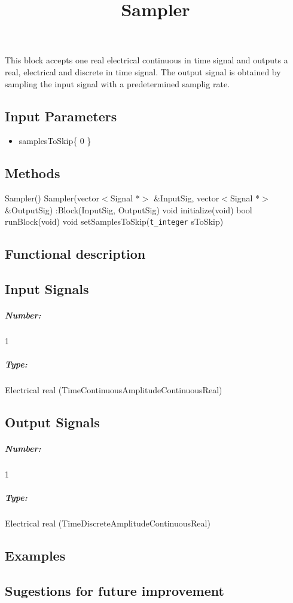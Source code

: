\documentclass[a4paper]{article}
\title{Sampler}
\begin{document}
\maketitle

This block accepts one real electrical continuous in time signal and outputs a real, electrical and discrete in time signal. The output signal is obtained by sampling the input signal with a predetermined samplig rate.

\subsection*{Input Parameters}

\begin{itemize}
	\item samplesToSkip\{ 0 \}
\end{itemize}

\subsection*{Methods}
 
Sampler() {}
\bigbreak
Sampler(vector$<$Signal *$>$ \&InputSig, vector$<$Signal *$>$ \&OutputSig) :Block(InputSig, OutputSig) {}
\bigbreak
void initialize(void)
\bigbreak
bool runBlock(void)
\bigbreak
void setSamplesToSkip(\texttt{t\_integer} sToSkip)

\subsection*{Functional description}


\pagebreak

\subsection*{Input Signals}

\subparagraph*{Number:} 1

\subparagraph*{Type:} Electrical real (TimeContinuousAmplitudeContinuousReal)

\subsection*{Output Signals}

\subparagraph*{Number:} 1

\subparagraph*{Type:} Electrical real (TimeDiscreteAmplitudeContinuousReal)

\subsection*{Examples} 

\subsection*{Sugestions for future improvement}
\end{document}

